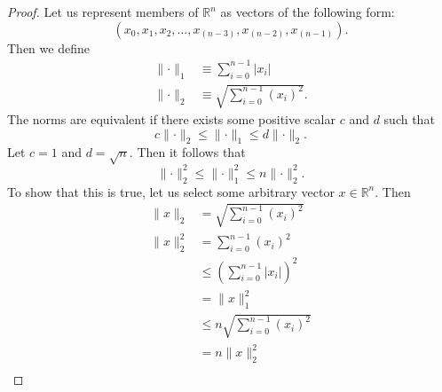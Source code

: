 \documentclass{article}
\begin{document}
\begin{enumerate}
\begin{enumerate}
\[                        \]
                        \begin{proof}
                              Let us represent members of $\mathbb{R}^n$ as
                              vectors of the following form:
                              \[
                                    (x_0, x_1, x_2, \ldots, x_{(n-3)}, x_{(n-2)}, x_{(n-1)}).
                              \]
                              Then we define
                              \begin{align*}
                                    \lVert\cdot\rVert_1 & \equiv \sum_{i=0}^{n-1}\lvert x_i\rvert \\
                                    \lVert\cdot\rVert_2 & \equiv \sqrt{\sum_{i=0}^{n-1}(x_i)^2}.
                              \end{align*}
                              The norms are equivalent if there exists some positive
                              scalar $c$ and $d$ such that
                              \[
                                    c\lVert\cdot\rVert_2 \leq \lVert\cdot\rVert_1 \leq d\lVert\cdot\rVert_2.
                              \]
                              Let $c=1$ and $d=\sqrt{n}$. Then it follows that
                              \[
                                    \lVert\cdot\rVert_2^2 \leq \lVert\cdot\rVert_1^2 \leq n\lVert\cdot\rVert_2^2.
                              \]
                              To show that this is true, let us select some arbitrary vector
                              $x\in\mathbb{R}^n$. Then
                              \begin{align*}
                                    \lVert x\rVert_2           & = \sqrt{\sum_{i=0}^{n-1}(x_i)^2}                     \\
                                    \lVert x\rVert_2^2         & = \sum_{i=0}^{n-1}(x_i)^2                            \\
                                                               & \leq \left(\sum_{i=0}^{n-1}\lvert x_i\rvert\right)^2 \\
                                                               & = \lVert x\rVert_1^2                                 \\
                                                               & \leq n\sqrt{\sum_{i=0}^{n-1}(x_i)^2}                 \\
                                                               & = n\lVert x\rVert_2^2                                \\

\end{align*}
\end{proof}
\end{enumerate}
\end{enumerate}
\end{document}

